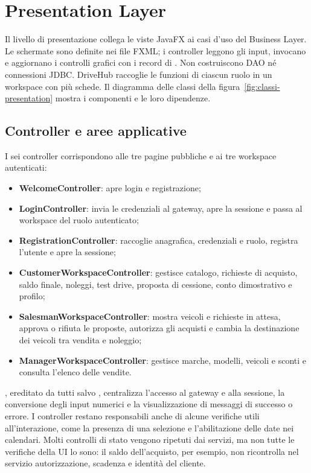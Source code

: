 \section{Presentation Layer}\label{sec:implementazione-ui}
Il livello di presentazione collega le viste JavaFX ai casi d'uso del Business Layer. Le schermate sono definite nei file FXML; i controller leggono gli input, invocano  e aggiornano i controlli grafici con i record di . Non costruiscono DAO né connessioni JDBC. DriveHub raccoglie le funzioni di ciascun ruolo in un workspace con più schede. Il diagramma delle classi della figura~\ref{fig:classi-presentation} mostra i componenti e le loro dipendenze.

\subsection{Controller e aree applicative}
I sei controller corrispondono alle tre pagine pubbliche e ai tre workspace autenticati:
\begin{itemize}
  \item \textbf{WelcomeController}: apre login e registrazione;
  \item \textbf{LoginController}: invia le credenziali al gateway, apre la sessione e passa al workspace del ruolo autenticato;
  \item \textbf{RegistrationController}: raccoglie anagrafica, credenziali e ruolo, registra l'utente e apre la sessione;
  \item \textbf{CustomerWorkspaceController}: gestisce catalogo, richieste di acquisto, saldo finale, noleggi, test drive, proposta di cessione, conto dimostrativo e profilo;
  \item \textbf{SalesmanWorkspaceController}: mostra veicoli e richieste in attesa, approva o rifiuta le proposte, autorizza gli acquisti e cambia la destinazione dei veicoli tra vendita e noleggio;
  \item \textbf{ManagerWorkspaceController}: gestisce marche, modelli, veicoli e sconti e consulta l'elenco delle vendite.
\end{itemize}
, ereditato da tutti salvo , centralizza l'accesso al gateway e alla sessione, la conversione degli input numerici e la visualizzazione di messaggi di successo o errore. I controller restano responsabili anche di alcune verifiche utili all'interazione, come la presenza di una selezione e l'abilitazione delle date nei calendari. Molti controlli di stato vengono ripetuti dai servizi, ma non tutte le verifiche della UI lo sono: il saldo dell'acquisto, per esempio, non ricontrolla nel servizio autorizzazione, scadenza e identità del cliente.

